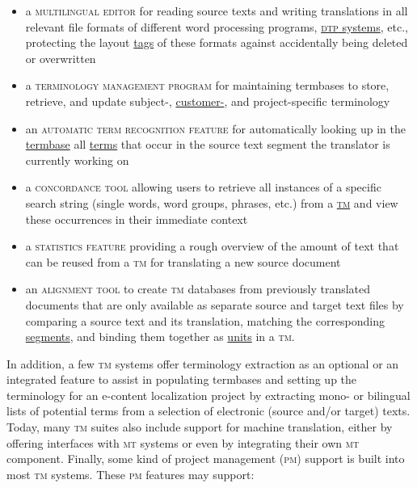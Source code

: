 \documentclass[output=paper]{LSP/langsci}
\begin{document}
\begin{itemize}
\item 
a \textsc{multilingual editor} for reading source texts and writing translations in all relevant file formats of different word processing programs, \href{http://ecolore.leeds.ac.uk/xml/materials/overview/glossary.xml?lang=en#dtp}{\textsc{dtp} systems}, etc., protecting the layout \href{http://ecolore.leeds.ac.uk/xml/materials/overview/glossary.xml?lang=en#tag}{tags} of these formats against accidentally being deleted or overwritten
\item  
a \textsc{terminology management program} for maintaining termbases to store, retrieve, and update subject-, \href{http://ecolore.leeds.ac.uk/xml/materials/overview/glossary.xml?lang=en#term_entry}{customer-}, and project-specific terminology
\item 
an \textsc{automatic term recognition} \textsc{feature }for automatically looking up in the \href{http://ecolore.leeds.ac.uk/xml/materials/overview/glossary.xml?lang=en#termbase}{termbase} all \href{http://ecolore.leeds.ac.uk/xml/materials/overview/glossary.xml?lang=en#term}{terms} that occur in the source text segment the translator is currently working on
\item 
a \textsc{concordance tool} allowing users to retrieve all instances of a specific search string (single words, word groups, phrases, etc.) from a \href{http://ecolore.leeds.ac.uk/xml/materials/overview/glossary.xml?lang=en#translation_memory}{\textsc{tm}} and view these occurrences in their immediate context
\item 
a \textsc{statistics feature} providing a rough overview of the amount of text that can be reused from a \textsc{tm} for translating a new source document
\item 
an \textsc{alignment tool} to create \textsc{tm} databases from previously translated documents that are only available as separate source and target text files by comparing a source text and its translation, matching the corresponding \href{http://ecolore.leeds.ac.uk/xml/materials/overview/glossary.xml?lang=en#segment}{segments}, and binding them together as \href{http://ecolore.leeds.ac.uk/xml/materials/overview/glossary.xml?lang=en#translation_unit}{units} in a \textsc{tm}.
\end{itemize}

In addition, a few \textsc{tm} systems offer terminology extraction as an optional or an integrated feature to assist in populating termbases and setting up the terminology for an e-content localization project by extracting mono- or bilingual lists of potential terms from a selection of electronic (source and/or target) texts. Today, many \textsc{tm} suites also include support for machine translation, either by offering interfaces with \textsc{mt} systems or even by integrating their own \textsc{mt} component. Finally, some kind of project management (\textsc{pm}) support is built into most \textsc{tm} systems. These \textsc{pm} features may support:
\end{document}
